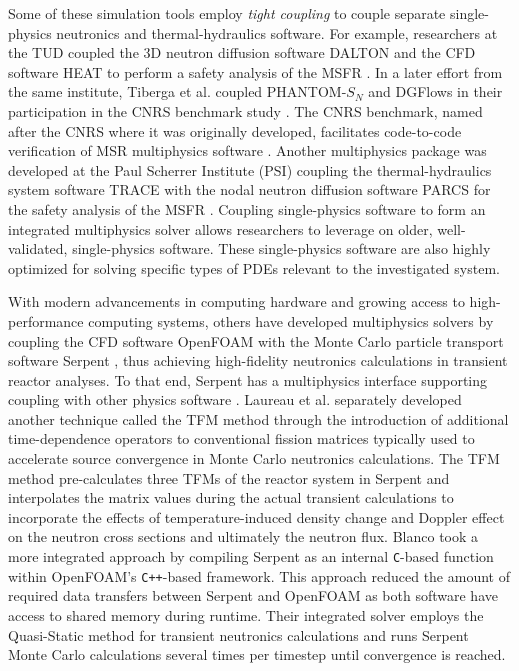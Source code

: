 Some of these simulation tools employ \textit{tight coupling} to couple
separate single-physics neutronics and thermal-hydraulics software. For
example, researchers at the \gls{TUD} coupled the 3D neutron diffusion software
DALTON \cite{boer_validation_2010} and the \gls{CFD} software HEAT
\cite{de_zwaan_static_2007} to perform a safety analysis of the \gls{MSFR}
\cite{fiorina_modelling_2014}. In a later effort from the same institute,
Tiberga et al. \cite{tiberga_discontinuous_2019} coupled PHANTOM-$S_N$ and
DGFlows in their participation in the CNRS benchmark study
\cite{tiberga_results_2020}. The CNRS benchmark, named after the \gls{CNRS}
where it was originally developed, facilitates code-to-code verification of
\gls{MSR} multiphysics software \cite{aufiero_testing_2018}. Another
multiphysics package was developed at the Paul Scherrer Institute (PSI)
coupling the thermal-hydraulics system software \gls{TRACE}
\cite{nrc_trace_2007} with the
nodal neutron diffusion software \gls{PARCS} \cite{downar_parcs_2010} for the
safety analysis of the \gls{MSFR} \cite{pettersen_coupled_2016}. Coupling
single-physics software to form an integrated multiphysics solver allows
researchers to leverage on older, well-validated, single-physics software.
These single-physics software are also highly optimized for solving specific
types of \glspl{PDE} relevant to the investigated system.

With modern advancements in computing hardware and growing access to
high-performance computing systems, others have developed multiphysics solvers
by coupling the \gls{CFD} software OpenFOAM
\cite{the_openfoam_foundation_ltd_openfoam_2021} with the Monte Carlo particle
transport software
Serpent \cite{leppanen_serpent_2014}, thus achieving high-fidelity neutronics
calculations in transient reactor analyses.
To that end, Serpent has a multiphysics interface supporting coupling
with other physics software \cite{leppanen_development_2013}.
Laureau et al. \cite{laureau_transient_2017}
separately developed another technique called the
\gls{TFM} method through the introduction of additional time-dependence
operators to conventional fission matrices typically used to accelerate source
convergence in Monte Carlo neutronics calculations. The \gls{TFM} method
pre-calculates three \glspl{TFM} of the reactor system in Serpent and
interpolates the matrix values during the actual transient calculations to
incorporate the effects of temperature-induced density change and Doppler
effect on the neutron cross sections and ultimately the neutron flux. Blanco
\cite{blanco_neutronic_2020} took a more integrated approach by
compiling Serpent as an internal \texttt{C}-based function within OpenFOAM's
\texttt{C++}-based framework. This approach reduced the amount of required data
transfers between Serpent and OpenFOAM as both software have access to shared
memory during runtime. Their integrated solver employs the Quasi-Static
method for transient neutronics calculations and runs Serpent Monte Carlo
calculations several times per timestep until convergence is reached.

